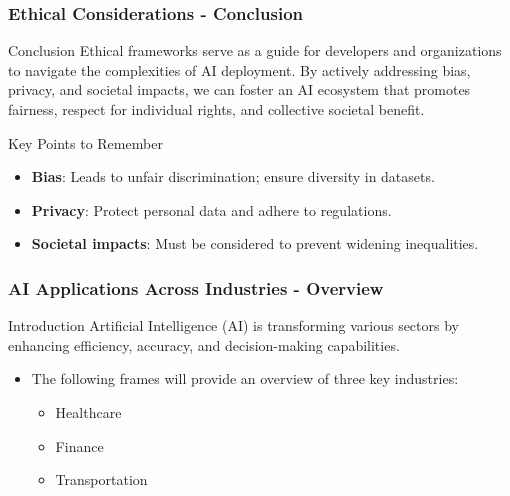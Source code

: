 \documentclass{beamer}
\begin{document}
\begin{frame}[fragile]
    \frametitle{Ethical Considerations - Conclusion}
    \begin{block}{Conclusion}
        Ethical frameworks serve as a guide for developers and organizations to navigate the complexities of AI deployment. 
        By actively addressing bias, privacy, and societal impacts, we can foster an AI ecosystem that promotes fairness, respect for individual rights, and collective societal benefit.
    \end{block}
    
    \begin{block}{Key Points to Remember}
        \begin{itemize}
            \item \textbf{Bias}: Leads to unfair discrimination; ensure diversity in datasets.
            \item \textbf{Privacy}: Protect personal data and adhere to regulations.
            \item \textbf{Societal impacts}: Must be considered to prevent widening inequalities.
        \end{itemize}
    \end{block}
\end{frame}

\begin{frame}[fragile]
    \frametitle{AI Applications Across Industries - Overview}
    \begin{block}{Introduction}
        Artificial Intelligence (AI) is transforming various sectors by enhancing efficiency, accuracy, and decision-making capabilities.
    \end{block}
    \begin{itemize}
        \item The following frames will provide an overview of three key industries:
        \begin{itemize}
            \item Healthcare
            \item Finance
            \item Transportation
        \end{itemize}
    \end{itemize}
\end{frame}
\end{document}
